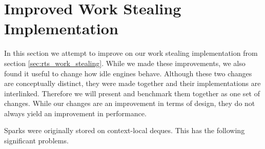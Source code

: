 
\section{Improved Work Stealing Implementation}
\label{sec:rts_work_stealing2}


In this section we attempt to improve on our work stealing
implementation from section \ref{sec:rts_work_stealing}.
While we made these improvements,
we also found it useful to change how idle engines behave.
Although these two changes are conceptually distinct,
they were made together and their implementations are interlinked.
Therefore we will present and benchmark them together as one set of changes.
While our changes are an improvement in terms of design,
they do not always yield an improvement in performance.

Sparks were originally stored on context-local deques.
This has the following significant problems.

